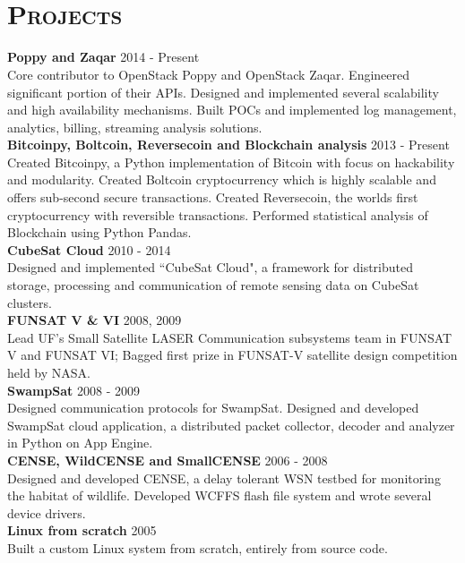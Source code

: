 \begin{resume}
\begin{formatb}
  \\
  \body\\
\end{formatb}

\section{\textsc{Projects}}
\textbf{Poppy and Zaqar} \hfill 2014 - Present\\
Core contributor to OpenStack Poppy and OpenStack Zaqar. Engineered significant portion of their APIs. Designed and implemented several scalability and high availability mechanisms. Built POCs and implemented log management, analytics, billing, streaming analysis solutions.\\
\textbf{Bitcoinpy, Boltcoin, Reversecoin and Blockchain analysis} \hfill 2013 - Present\\
Created Bitcoinpy, a Python implementation of Bitcoin with focus on hackability and modularity. Created Boltcoin cryptocurrency which is highly scalable and offers sub-second secure transactions. Created Reversecoin, the worlds first cryptocurrency with reversible transactions. Performed statistical analysis of Blockchain using Python Pandas.\\
\textbf{CubeSat Cloud} \hfill 2010 - 2014 \\
Designed and implemented ``CubeSat Cloud", a framework for distributed storage, processing and communication of remote sensing data on CubeSat clusters.\\
\textbf{FUNSAT V \& VI} \hfill 2008, 2009 \\
Lead UF's Small Satellite LASER Communication subsystems team in FUNSAT V and FUNSAT VI; Bagged first prize in FUNSAT-V satellite design competition held by NASA.\\
\textbf{SwampSat} \hfill 2008 - 2009\\
Designed communication protocols for SwampSat. Designed and developed SwampSat cloud application, a distributed packet collector, decoder and analyzer in Python on App Engine.\\
\textbf{CENSE, WildCENSE and SmallCENSE} \hfill 2006 - 2008\\
Designed and developed CENSE, a delay tolerant WSN testbed for monitoring the habitat of wildlife. Developed WCFFS flash file system and wrote several device drivers.\\
\textbf{Linux from scratch} \hfill 2005 \\
Built a custom Linux system from scratch, entirely from source code.


\end{resume}
